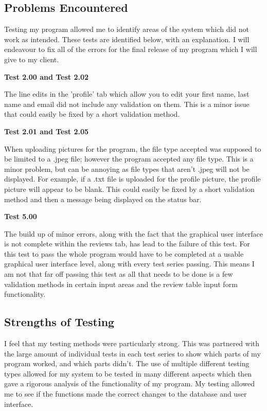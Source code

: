 \subsection{Problems Encountered} %

Testing my program allowed me to identify areas of the system which did not work as intended. These tests are identified below, with an explanation. I will endeavour to fix all of the errors for the final release of my program which I will give to my client.

\textbf{Test 2.00 and Test 2.02 }

The line edits in the 'profile' tab which allow you to edit your first name, last name and email did not include any validation on them. This is a minor issue that could easily be fixed by a short validation method. 

\textbf{Test 2.01 and Test 2.05}

When uploading pictures for the program, the file type accepted was supposed to be limited to a .jpeg file; however the program accepted any file type. This is a minor problem, but can be annoying as file types that aren't .jpeg will not be displayed. For example, if a .txt file is uploaded for the profile picture, the profile picture will appear to be blank. This could easily be fixed by a short validation method and then a message being displayed on the status bar. 


\textbf{Test 5.00}

The build up of minor errors, along with the fact that the graphical user interface is not complete within the reviews tab, has lead to the failure of this test. For this test to pass the whole program would have to be completed at a usable graphical user interface level, along with every test series passing. This means I am not that far off passing this test as all that needs to be done is a few validation methods in certain input areas and the review table input form functionality.

\subsection{Strengths of Testing} %

I feel that my testing methods were particularly strong. This was partnered with the large amount of individual tests in each test series to show which parts of my program worked, and which parts didn't. The use of multiple different testing types allowed for my system to be tested in many different aspects which then gave a rigorous analysis of the functionality of my program. My testing allowed me to see if the functions made the correct changes to the database and user interface.

